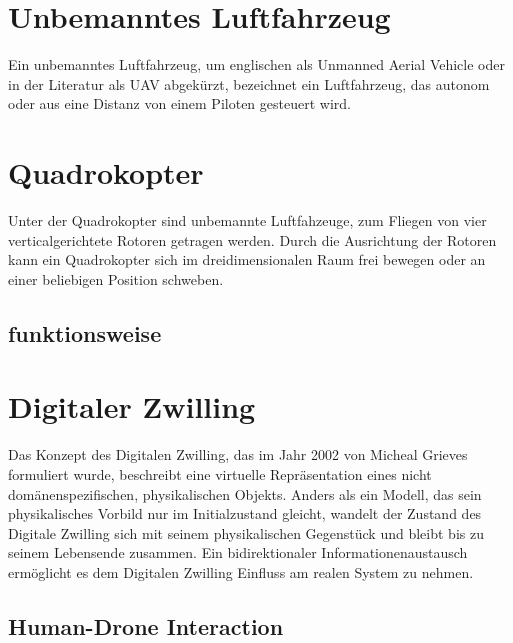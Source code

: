 
\section{Unbemanntes Luftfahrzeug}
Ein unbemanntes Luftfahrzeug, um englischen als Unmanned Aerial Vehicle oder in der Literatur als UAV abgekürzt, bezeichnet ein Luftfahrzeug, das autonom oder aus eine Distanz von einem Piloten gesteuert wird.

\section{Quadrokopter}
Unter der Quadrokopter sind unbemannte Luftfahzeuge, zum Fliegen von vier verticalgerichtete Rotoren getragen werden. Durch die Ausrichtung der Rotoren kann ein Quadrokopter sich  im dreidimensionalen Raum frei bewegen oder an einer beliebigen Position schweben. 

\subsection{funktionsweise}


\section{Digitaler Zwilling}

Das Konzept des Digitalen Zwilling, das im Jahr 2002 von Micheal Grieves formuliert wurde, beschreibt eine virtuelle Repräsentation eines nicht domänenspezifischen, physikalischen Objekts. Anders als ein Modell, das sein physikalisches Vorbild nur im Initialzustand gleicht, wandelt der Zustand des Digitale Zwilling sich mit seinem physikalischen Gegenstück und bleibt bis zu seinem Lebensende zusammen. 
Ein bidirektionaler Informationenaustausch ermöglicht es dem Digitalen Zwilling Einfluss am realen System zu nehmen. 


\subsection{Human-Drone Interaction}
